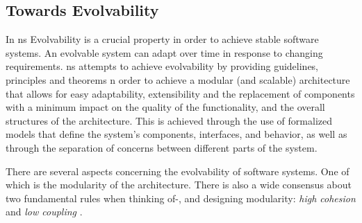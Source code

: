 \subsection{Towards Evolvability} \label{sec:on_modules}

In \gls{ns} Evolvability is a crucial property in order to achieve stable software
systems. An evolvable system can adapt over time in response to changing requirements.
\gls{ns} attempts to achieve evolvability by providing guidelines, principles and theorems
n order to achieve a modular (and scalable) architecture that allows for easy
adaptability, extensibility and the replacement of components with a minimum impact on the
quality of the functionality, and the overall structures of the architecture. This is
achieved through the use of formalized models that define the system's components,
interfaces, and behavior, as well as through the separation of concerns between different
parts of the system.

There are several aspects concerning the evolvability of software systems. One of which is
the modularity of the architecture. There is also a wide consensus about two fundamental
rules when thinking of-, and designing modularity: \emph{high cohesion} and \emph{low
coupling} \autocite[22]{mannaert_normalized_2016}.
